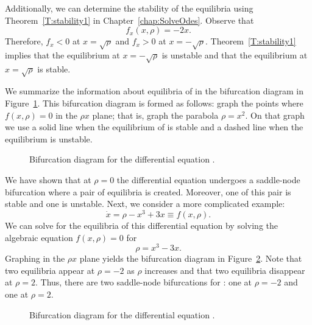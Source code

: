 Additionally, we can determine the stability
of the equilibria using 
Theorem~\ref{T:stability1} in Chapter~\ref{chap:SolveOdes}.  Observe that
\[
f_x(x,\rho) = -2x.
\]
Therefore, $f_x<0$ at $x=\sqrt{\rho}$ and $f_x>0$ at $x=-\sqrt{\rho}$.
Theorem~\ref{T:stability1} implies that the equilibrium at $x=-\sqrt{\rho}$ 
is unstable and that the equilibrium at $x=\sqrt{\rho}$ is stable.

We summarize the information about equilibria of  in the 
bifurcation diagram in Figure~\ref{F:sbifBIF}.  
This bifurcation diagram is formed as follows: graph the points where 
$f(x,\rho)=0$ in the $\rho x$ plane; that is, graph the parabola $\rho=x^2$.  
On that graph we use a solid line when the equilibrium of  is 
stable and a dashed line when the equilibrium is unstable.

\begin{figure}[htb]
           \centerline{%
           }
           \caption{Bifurcation diagram for the differential equation
        \protect{}. }
           \label{F:sbifBIF}
\end{figure}

We have shown that at $\rho=0$ the differential equation  
undergoes a saddle-node bifurcation
where a pair of equilibria is created.  Moreover, one of this pair is stable 
and one is unstable.  Next, we consider a more complicated example:
\begin{equation} \label{E:cbif}
\dot{x} = \rho - x^3 + 3x \equiv f(x,\rho).
\end{equation}
We can solve for the equilibria of this differential equation by solving
the algebraic equation $f(x,\rho)=0$ for
\begin{equation}  \label{E:rho=cubic}
\rho = x^3 - 3x.
\end{equation}
Graphing  in the $\rho x$ plane yields the bifurcation 
diagram in Figure~\ref{F:cbifBIF}.  Note that two equilibria appear at 
$\rho=-2$ as $\rho$ increases and that two equilibria disappear at 
$\rho=2$.  Thus, there are two saddle-node bifurcations for : 
one at $\rho=-2$ and one at $\rho=2$.

\begin{figure}[htb]
           \centerline{%
           }
           \caption{Bifurcation diagram for the differential equation
        \protect{}.}
           \label{F:cbifBIF}
\end{figure} 

